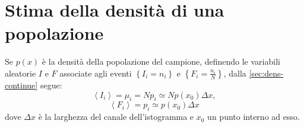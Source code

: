 \section{Stima della densità di una popolazione} %
\label{sec:test-densità}
Se $p\left( x \right) $ è la densità della popolazione del campione, definendo le variabili aleatorie $I$ e $F$ associate agli eventi $\left\{ { I }_{ i }={ n }_{ i } \right\} $ e $\left\{ { F }_{ i }=\frac { { n }_{ i } }{ N }  \right\} $, dalla \ref{sec:dens-continue} segue:
\begin{equation}
\label{eq:valore-atteso}
\left< { I }_{ i } \right> ={ \mu  }_{ i }=N{ p }_{ i }\simeq Np\left( { x }_{ 0 } \right) \Delta x,
\end{equation}
\begin{equation}
\left< { F }_{ i } \right> ={ p }_{ i }\simeq p\left( { x }_{ 0 } \right) \Delta x
\end{equation}
dove $\Delta x$ è la larghezza del canale dell'istogramma e $x_0$ un punto interno ad esso.

